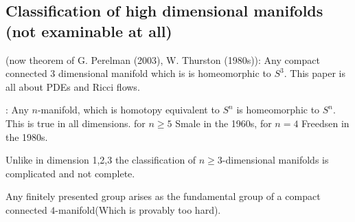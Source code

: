 \subsection{Classification of high dimensional manifolds (not examinable at all)}

 (now theorem of G. Perelman (2003), W. Thurston (1980s)):
Any compact connected \(3\) dimensional manifold which is 
is homeomorphic to \(S^3\). This paper is all about PDEs and Ricci flows. 

: Any \(n\)-manifold, which is homotopy equivalent to \(S^n\) 
is homeomorphic to \(S^n\). This is true in all dimensions. for \(n\geq 5\) Smale in the 1960s,
for \(n=4\) Freedsen in the 1980s.

Unlike in dimension 1,2,3 the classification of \(n\geq 3\)-dimensional manifolds is 
complicated and not complete.

\begin{example}
    Any finitely presented group arises as the fundamental group of a compact 
    connected \(4\)-manifold(Which is provably too hard). 
\end{example}








